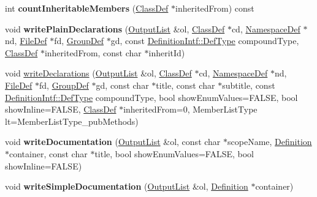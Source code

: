\begin{DoxyCompactItemize}
\item 
\hypertarget{class_member_list_af68ae71d4aa30721620cc315f8e68484}{int {\bfseries count\-Inheritable\-Members} (\hyperlink{class_class_def}{Class\-Def} $\ast$inherited\-From) const }\label{class_member_list_af68ae71d4aa30721620cc315f8e68484}

\item 
\hypertarget{class_member_list_ace650828cd522de0258c3f95cc2372b9}{void {\bfseries write\-Plain\-Declarations} (\hyperlink{class_output_list}{Output\-List} \&ol, \hyperlink{class_class_def}{Class\-Def} $\ast$cd, \hyperlink{class_namespace_def}{Namespace\-Def} $\ast$nd, \hyperlink{class_file_def}{File\-Def} $\ast$fd, \hyperlink{class_group_def}{Group\-Def} $\ast$gd, const \hyperlink{class_definition_intf_a2dc566dfec40397b2990e6520536ecb5}{Definition\-Intf\-::\-Def\-Type} compound\-Type, \hyperlink{class_class_def}{Class\-Def} $\ast$inherited\-From, const char $\ast$inherit\-Id)}\label{class_member_list_ace650828cd522de0258c3f95cc2372b9}

\item 
void \hyperlink{class_member_list_aea865e6d1782ac9bde5fa744b01de52d}{write\-Declarations} (\hyperlink{class_output_list}{Output\-List} \&ol, \hyperlink{class_class_def}{Class\-Def} $\ast$cd, \hyperlink{class_namespace_def}{Namespace\-Def} $\ast$nd, \hyperlink{class_file_def}{File\-Def} $\ast$fd, \hyperlink{class_group_def}{Group\-Def} $\ast$gd, const char $\ast$title, const char $\ast$subtitle, const \hyperlink{class_definition_intf_a2dc566dfec40397b2990e6520536ecb5}{Definition\-Intf\-::\-Def\-Type} compound\-Type, bool show\-Enum\-Values=F\-A\-L\-S\-E, bool show\-Inline=F\-A\-L\-S\-E, \hyperlink{class_class_def}{Class\-Def} $\ast$inherited\-From=0, Member\-List\-Type lt=Member\-List\-Type\-\_\-pub\-Methods)
\item 
\hypertarget{class_member_list_a16fd835dcfb25ac6c47033f6652167ea}{void {\bfseries write\-Documentation} (\hyperlink{class_output_list}{Output\-List} \&ol, const char $\ast$scope\-Name, \hyperlink{class_definition}{Definition} $\ast$container, const char $\ast$title, bool show\-Enum\-Values=F\-A\-L\-S\-E, bool show\-Inline=F\-A\-L\-S\-E)}\label{class_member_list_a16fd835dcfb25ac6c47033f6652167ea}

\item 
\hypertarget{class_member_list_a1dcba083216ec60854c53e17b81eb12f}{void {\bfseries write\-Simple\-Documentation} (\hyperlink{class_output_list}{Output\-List} \&ol, \hyperlink{class_definition}{Definition} $\ast$container)}\label{class_member_list_a1dcba083216ec60854c53e17b81eb12f}


\end{DoxyCompactItemize}
